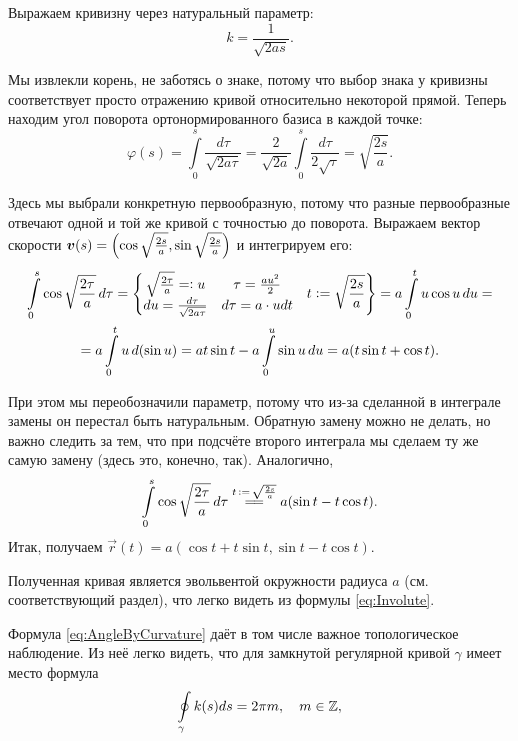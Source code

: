 
\begin{solution}
	Выражаем кривизну через натуральный параметр:
	\[
		k = \frac{1}{\sqrt{2as}}.
	\]

	Мы извлекли корень, не заботясь о знаке, потому что выбор знака у кривизны соответствует просто отражению кривой относительно некоторой прямой. Теперь находим угол поворота ортонормированного базиса в каждой точке:
	\[
		\varphi(s) = \int\limits_0^s\frac{d\tau}{\sqrt{2a\tau}} = \frac{2}{\sqrt{2a}}\int\limits_0^s\frac{d\tau}{2\sqrt{\tau}} = \sqrt{\frac{2s}{a}}.
	\]

	Здесь мы выбрали конкретную первообразную, потому что разные первообразные отвечают одной и той же кривой с точностью до поворота. Выражаем вектор скорости $\boldsymbol{v}(s) = \left(\cos\sqrt{\frac{2s}{a}}, \sin\sqrt{\frac{2s}{a}}\right)$ и интегрируем его:
	\begin{multline*}
		\int\limits_0^s\cos\sqrt{\frac{2\tau}{a}}\,d\tau = \left\{
			\begin{matrix}
				\sqrt{\frac{2\tau}{a}} = \vcentcolon u & \tau = \frac{au^2}{2} \\
				du = \frac{d\tau}{\sqrt{2a\tau}} & d\tau = a \cdot u dt
			\end{matrix}\quad t \vcentcolon = \sqrt{\frac{2s}{a}}
			\right\} = a\int\limits_0^tu\cos u\,du =\\ = a\int\limits_0^tu\,d(\sin u) = a t\sin t - a\int\limits_0^u\sin u\,du = a(t\sin t + \cos t).
	\end{multline*}

	При этом мы переобозначили параметр, потому что из-за сделанной в интеграле замены он перестал быть натуральным. Обратную замену можно не делать, но важно следить за тем, что при подсчёте второго интеграла мы сделаем ту же самую замену (здесь это, конечно, так). Аналогично,
	\[
		\int\limits_0^s\cos\sqrt{\frac{2\tau}{a}}\,d\tau \stackrel{t\,\vcentcolon =\,\sqrt{\frac{2s}{a}}}{=\joinrel=} a(\sin t - t\cos t).
	\]
	Итак, получаем $\vec{r}(t) = a(\cos t + t \sin t, \sin t - t \cos t)$.
\end{solution}

Полученная кривая является эвольвентой окружности радиуса $a$ (см. соответствующий раздел), что легко видеть из формулы \eqref{eq:Involute}.

Формула \eqref{eq:AngleByCurvature} даёт в том числе важное топологическое наблюдение. Из неё легко видеть, что для замкнутой регулярной кривой $\gamma$ имеет место формула
\begin{equation} \label{eq:HomoTopInvariant}
	\oint\limits_{\gamma}k(s)ds = 2\pi m,\quad m \in \mathbb{Z},
\end{equation}

